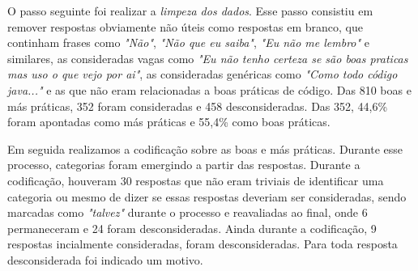 O passo seguinte foi realizar a \textit{limpeza dos dados}. Esse passo consistiu em remover respostas obviamente n\~ao \'uteis como respostas em branco, que continham frases como \textit{"N\~ao"}, \textit{"N\~ao que eu saiba"}, \textit{"Eu n\~ao me lembro"} e similares, as consideradas vagas como \textit{"Eu n\~ao tenho certeza se s\~ao boas praticas mas uso o que vejo por ai"}, as consideradas gen\'ericas como \textit{"Como todo c\'odigo java..."} e as que n\~ao eram relacionadas a boas pr\'aticas de c\'odigo. Das 810 boas e m\'as pr\'aticas, 352 foram consideradas e 458 desconsideradas. Das 352, 44,6\% foram apontadas como m\'as pr\'aticas e 55,4\% como boas pr\'aticas. 

Em seguida realizamos a codifica\c{c}\~ao sobre as boas e m\'as pr\'aticas. Durante esse processo, categorias foram emergindo a partir das respostas. Durante a codifica\c{c}\~ao, houveram 30 respostas que n\~ao eram triviais de identificar uma categoria ou mesmo de dizer se essas respostas deveriam ser consideradas, sendo marcadas como \textit{"talvez"} durante o processo e reavaliadas ao final, onde 6 permaneceram e 24 foram desconsideradas. Ainda durante a codifica\c{c}\~ao, 9 respostas incialmente consideradas, foram desconsideradas. Para toda resposta desconsiderada foi indicado um motivo.